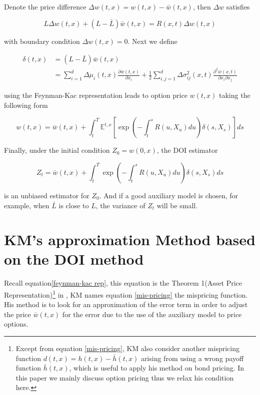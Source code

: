 Denote the price difference $\Delta w(t,x) = w(t,x) - \bar{w}(t,x)$, then $\Delta w$ satisfies 

\begin{equation}
    L \Delta w(t, x)+ (L-\bar{L}) \bar{w}(t,x)=R(x, t) \Delta w(t, x)
\end{equation}

\noindent with boundary condition $\Delta w(t,x) = 0$. Next we define

\begin{equation}\label{mis-pricing}
    \begin{aligned}
        \delta(t,x) &= (L-\bar{L}) \bar{w}(t,x) \\
        &=\sum_{i=1}^{d} \Delta \mu_{i}(t,x) \frac{\partial \bar{w}(t,x)}{\partial x_{i}}+\frac{1}{2} \sum_{i, j=1}^{d} \Delta \sigma_{i j}^{2}(x, t) \frac{\partial^{2} \bar{w}(x,t)}{\partial x_{i} \partial x_{j}}
    \end{aligned}
\end{equation}

\noindent using the Feynman-Kac representation leads to option price $w(t,x)$ taking the following form

\begin{equation}\label{feynman-kac rep}
        w(t, x)=\bar{w}(t,x)+\int_{t}^{T} \mathbb{E}^{t,x}\left[\exp \left(-\int_{t}^{s} R(u, X_u) d u\right) \delta(s,X_s)\right] d s
\end{equation}

\noindent Finally, under the initial condition $Z_0 = w(0,x)$, the DOI estimator

\begin{equation}
        Z_t =\bar{w}(t, x)+\int_{t}^{T} \exp \left(-\int_{t}^{s} R(u, X_u) d u\right) \delta(s,X_s)d s
\end{equation}

\noindent is an unbiased estimator for $Z_0$. And if a good auxiliary model is chosen, for example, when $\bar{L}$ is close to $L$, the variance of $Z_t$ will be small.

\section{KM's approximation Method based on the DOI method}
\label{sec: 2.2}

Recall equation\eqref{feynman-kac rep}, this equation is the Theorem 1(Asset Price Representation)\footnote{Except from equation \eqref{mis-pricing}, KM also consider another mispricing function $d(t,x)=h(t,x)-\bar{h}(t,x)$ arising from using a wrong payoff function $\bar{h}(t,x)$, which is useful to apply his method on bond pricing. In this paper we mainly discuss option pricing thus we relax his condition here.} in \cite{kristensen_adding_2011}, KM names equation \eqref{mis-pricing} the mispricing function. His method is to look for an approximation of the error term in order to adjust the price $\bar{w}(t,x)$ for the error due to the use of the auxiliary model to price options.

